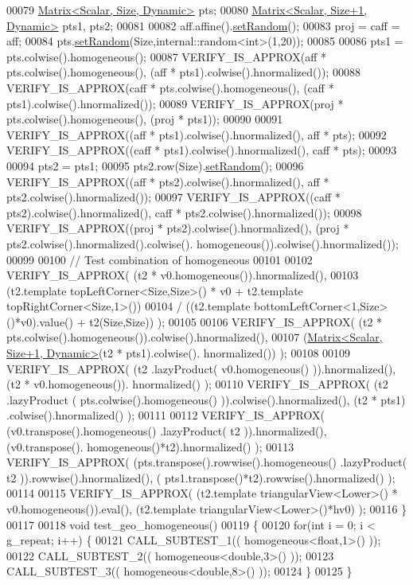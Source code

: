 \begin{DoxyCode}
00079   \hyperlink{group___core___module_class_eigen_1_1_matrix}{Matrix<Scalar, Size, Dynamic>}   pts;
00080   \hyperlink{group___core___module_class_eigen_1_1_matrix}{Matrix<Scalar, Size+1, Dynamic>} pts1, pts2;
00081 
00082   aff.affine().\hyperlink{class_eigen_1_1_plain_object_base_af0e576a0e1aefc9ee346de44cc352ba3}{setRandom}();
00083   proj = caff = aff;
00084   pts.\hyperlink{class_eigen_1_1_plain_object_base_af0e576a0e1aefc9ee346de44cc352ba3}{setRandom}(Size,internal::random<int>(1,20));
00085   
00086   pts1 = pts.colwise().homogeneous();
00087   VERIFY\_IS\_APPROX(aff  * pts.colwise().homogeneous(), (aff  * pts1).colwise().hnormalized());
00088   VERIFY\_IS\_APPROX(caff * pts.colwise().homogeneous(), (caff * pts1).colwise().hnormalized());
00089   VERIFY\_IS\_APPROX(proj * pts.colwise().homogeneous(), (proj * pts1));
00090 
00091   VERIFY\_IS\_APPROX((aff  * pts1).colwise().hnormalized(),  aff  * pts);
00092   VERIFY\_IS\_APPROX((caff * pts1).colwise().hnormalized(), caff * pts);
00093   
00094   pts2 = pts1;
00095   pts2.row(Size).\hyperlink{class_eigen_1_1_plain_object_base_af0e576a0e1aefc9ee346de44cc352ba3}{setRandom}();
00096   VERIFY\_IS\_APPROX((aff  * pts2).colwise().hnormalized(), aff  * pts2.colwise().hnormalized());
00097   VERIFY\_IS\_APPROX((caff * pts2).colwise().hnormalized(), caff * pts2.colwise().hnormalized());
00098   VERIFY\_IS\_APPROX((proj * pts2).colwise().hnormalized(), (proj * pts2.colwise().hnormalized().colwise().
      homogeneous()).colwise().hnormalized());
00099   
00100   \textcolor{comment}{// Test combination of homogeneous}
00101   
00102   VERIFY\_IS\_APPROX( (t2 * v0.homogeneous()).hnormalized(),
00103                        (t2.template topLeftCorner<Size,Size>() * v0 + t2.template topRightCorner<Size,1>())
00104                      / ((t2.template bottomLeftCorner<1,Size>()*v0).value() + t2(Size,Size)) );
00105   
00106   VERIFY\_IS\_APPROX( (t2 * pts.colwise().homogeneous()).colwise().hnormalized(),
00107                     (\hyperlink{group___core___module_class_eigen_1_1_matrix}{Matrix<Scalar, Size+1, Dynamic>}(t2 * pts1).colwise().
      hnormalized()) );
00108   
00109   VERIFY\_IS\_APPROX( (t2 .lazyProduct( v0.homogeneous() )).hnormalized(), (t2 * v0.homogeneous()).
      hnormalized() );
00110   VERIFY\_IS\_APPROX( (t2 .lazyProduct  ( pts.colwise().homogeneous() )).colwise().hnormalized(), (t2 * pts1)
      .colwise().hnormalized() );
00111   
00112   VERIFY\_IS\_APPROX( (v0.transpose().homogeneous() .lazyProduct( t2 )).hnormalized(), (v0.transpose().
      homogeneous()*t2).hnormalized() );
00113   VERIFY\_IS\_APPROX( (pts.transpose().rowwise().homogeneous() .lazyProduct( t2 )).rowwise().hnormalized(), (
      pts1.transpose()*t2).rowwise().hnormalized() );
00114 
00115   VERIFY\_IS\_APPROX( (t2.template triangularView<Lower>() * v0.homogeneous()).eval(), (t2.template 
      triangularView<Lower>()*hv0) );
00116 \}
00117 
00118 \textcolor{keywordtype}{void} test\_geo\_homogeneous()
00119 \{
00120   \textcolor{keywordflow}{for}(\textcolor{keywordtype}{int} i = 0; i < g\_repeat; i++) \{
00121     CALL\_SUBTEST\_1(( homogeneous<float,1>() ));
00122     CALL\_SUBTEST\_2(( homogeneous<double,3>() ));
00123     CALL\_SUBTEST\_3(( homogeneous<double,8>() ));
00124   \}
00125 \}
\end{DoxyCode}
